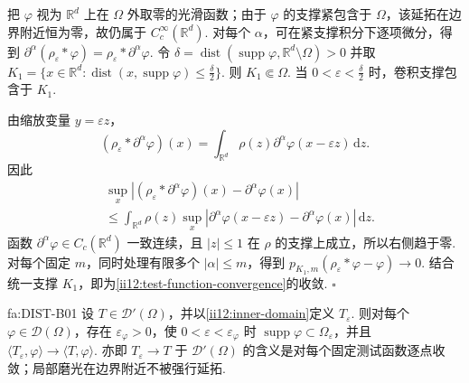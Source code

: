 \begin{FAProof}
把 \(\displaystyle\varphi\) 视为 \(\displaystyle\mathbb R^d\) 上在 \(\displaystyle\Omega\) 外取零的光滑函数；由于 \(\displaystyle\varphi\) 的支撑紧包含于 \(\displaystyle\Omega\)，该延拓在边界附近恒为零，故仍属于 \(\displaystyle C_c^\infty(\mathbb R^d)\). 对每个 \(\displaystyle\alpha\)，可在紧支撑积分下逐项微分，得到 \(\displaystyle \partial^\alpha(\rho_\varepsilon*\varphi) = \rho_\varepsilon*\partial^\alpha\varphi.\)
令 \(\displaystyle \delta = \operatorname{dist}(\operatorname{supp}\varphi,\mathbb R^d\setminus\Omega)>0\)
并取 \(\displaystyle K_1 = \{x\in\mathbb R^d:\operatorname{dist}(x,\operatorname{supp}\varphi)\leqslant\frac{\delta}{2}\}.\)
则 \(\displaystyle K_1\Subset\Omega\). 当 \(\displaystyle0<\varepsilon<\frac{\delta}{2}\) 时，卷积支撑包含于 \(\displaystyle K_1\).

由缩放变量 \(\displaystyle y=\varepsilon z\)，
\[
(\rho_\varepsilon*\partial^\alpha\varphi)(x)
=
\int_{\mathbb R^d}\rho(z)\partial^\alpha\varphi(x-\varepsilon z)\,\mathrm{d}z.
\]
因此
\[
\begin{aligned}
&\sup_x| (\rho_\varepsilon*\partial^\alpha\varphi)(x)-\partial^\alpha\varphi(x)|\\
&\leqslant
\int_{\mathbb R^d}\rho(z)
\sup_x|\partial^\alpha\varphi(x-\varepsilon z)-\partial^\alpha\varphi(x)|\,\mathrm{d}z.
\end{aligned}
\]
函数 \(\displaystyle\partial^\alpha\varphi\in C_c(\mathbb R^d)\) 一致连续，且 \(\displaystyle|z|\leqslant1\) 在 \(\displaystyle\rho\) 的支撑上成立，所以右侧趋于零. 对每个固定 \(\displaystyle m\)，同时处理有限多个 \(\displaystyle|\alpha|\leqslant m\)，得到 \(\displaystyle p_{K_1,m}(\rho_\varepsilon*\varphi-\varphi)\longrightarrow0.\)
结合统一支撑 \(\displaystyle K_1\)，即为\autoref{ii12:test-function-convergence}的收敛.
\hfill\(\square\)
\end{FAProof}

\begin{FATheorem}[B][磨光核对分布的局部逼近]{fa:DIST-B01}
设 \(\displaystyle T\in\mathcal D'(\Omega)\)，并以\autoref{ii12:inner-domain}定义 \(\displaystyle T_\varepsilon\). 则对每个 \(\displaystyle\varphi\in\mathcal D(\Omega)\)，存在 \(\displaystyle\varepsilon_\varphi>0\)，使 \(\displaystyle0<\varepsilon<\varepsilon_\varphi\) 时 \(\displaystyle\operatorname{supp}\varphi\subset\Omega_\varepsilon\)，并且 \(\displaystyle \langle T_\varepsilon,\varphi\rangle \longrightarrow \langle T,\varphi\rangle.\)
亦即 \(\displaystyle T_\varepsilon\to T\) 于 \(\displaystyle\mathcal D'(\Omega)\) 的含义是对每个固定测试函数逐点收敛；局部磨光在边界附近不被强行延拓.
\end{FATheorem}


